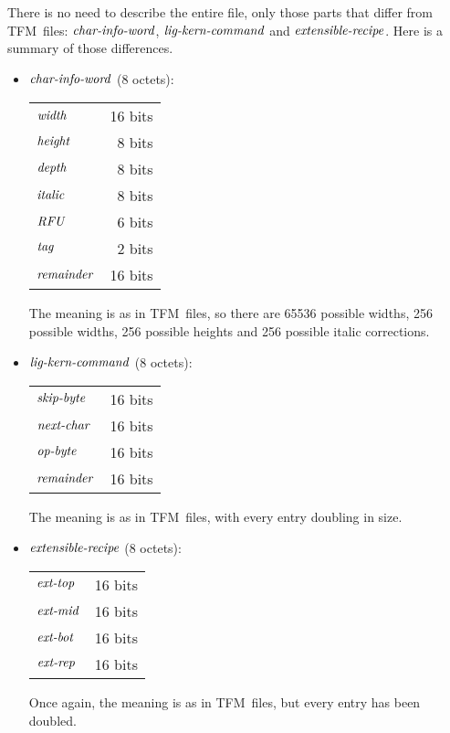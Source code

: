 \documentclass[fleqn]{article}
\newcommand{\myit}[1]{\mbox{\emph{#1}}}
\newcommand{\TFM}{TFM}
\begin{document}
There is no need to describe the entire file, only those parts that differ
from \TFM\ files:  $\myit{char-info-word}$,
$\myit{lig-kern-command}$ and $\myit{extensible-recipe}$.
Here is a summary of those differences.
\begin{itemize}
\item $\myit{char-info-word}$ (8 octets):

\begin{tabular}{lr}
$\myit{width}$ & 16 bits\\
$\myit{height}$ & 8 bits\\
$\myit{depth}$ & 8 bits\\
$\myit{italic}$ & 8 bits\\
$\myit{RFU}$ & 6 bits\\
$\myit{tag}$ & 2 bits\\
$\myit{remainder}$ & 16 bits\\
\end{tabular}

The meaning is as in \TFM\ files, so there are 65536 possible widths,
256 possible widths, 256 possible heights and 256 possible italic corrections.

\item $\myit{lig-kern-command}$ (8 octets):

\begin{tabular}{lr}
$\myit{skip-byte}$ & 16 bits\\
$\myit{next-char}$ & 16 bits\\
$\myit{op-byte}$ & 16 bits\\
$\myit{remainder}$ & 16 bits\\
\end{tabular}

The meaning is as in \TFM\ files, with every entry doubling in size.

\item $\myit{extensible-recipe}$ (8 octets):

\begin{tabular}{lr}
$\myit{ext-top}$ & 16 bits\\
$\myit{ext-mid}$ & 16 bits\\
$\myit{ext-bot}$ & 16 bits\\
$\myit{ext-rep}$ & 16 bits\\
\end{tabular}

Once again, the meaning is as in \TFM\ files, but every entry has
been doubled.
\end{itemize}
\end{document}
